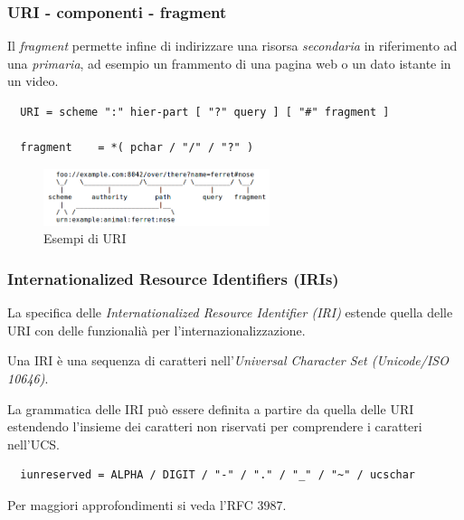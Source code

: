 \documentclass[8pt]{beamer}
\begin{document}
\begin{frame}[fragile]
	\frametitle{URI - componenti - fragment}
	
	Il \emph{fragment} permette infine di indirizzare una risorsa
	\emph{secondaria} in riferimento ad una \emph{primaria}, ad esempio un
	frammento di una pagina web o un dato istante in un video.
	
	\begin{verbatim}
  URI = scheme ":" hier-part [ "?" query ] [ "#" fragment ]

  fragment    = *( pchar / "/" / "?" )
	\end{verbatim}
	
	\vspace{\baselineskip}
	
	\begin{figure}
	    \includegraphics[width=250px]{imgs/uri-pieces.png}
	    \caption{Esempi di URI}
	\end{figure}
	
\end{frame}

\begin{frame}[fragile]
	\frametitle{Internationalized Resource Identifiers (IRIs)}

	La specifica delle \emph{Internationalized Resource Identifier (IRI)}
	estende quella delle URI con delle funzionali\`a per l'internazionalizzazione.
	\vspace{\baselineskip}
	 
	Una IRI \`e una sequenza di caratteri nell'\emph{Universal Character Set
	(Unicode/ISO 10646)}.
	
	La grammatica delle IRI pu\`o essere definita a partire da quella delle URI
	estendendo l'insieme dei caratteri non riservati per comprendere i caratteri
	nell'UCS.
	\begin{verbatim}
  iunreserved = ALPHA / DIGIT / "-" / "." / "_" / "~" / ucschar
	\end{verbatim}
	\vspace{\baselineskip}
	
	Per maggiori approfondimenti si veda l'RFC 3987.
\end{frame}
\end{document}
